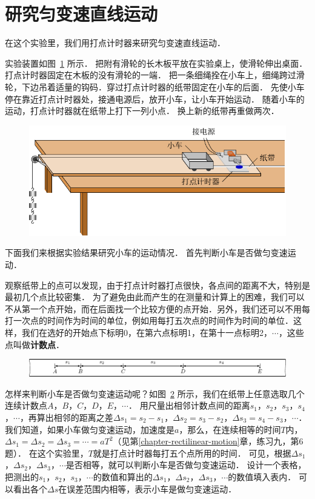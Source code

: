 \section{研究匀变速直线运动}\label{sec-A-app-1-7-study of-uniformly-variable-linear-motion}
在这个实验里，我们用打点计时器来研究匀变速直线运动．

实验装置如图~\ref{fig_A_10-9} 所示．
把附有滑轮的长木板平放在实验桌上，使滑轮伸出桌面．打点计时器固定在木板的没有滑轮的一端．
把一条细绳拴在小车上，细绳跨过滑轮，下边吊着适量的钩码．穿过打点计时器的纸带固定在小车的后面．
先使小车停在靠近打点计时器处，接通电源后，放开小车，让小车开始运动．
随着小车的运动，打点计时器就在纸带上打下一列小点．
换上新的纸带再重做两次．	
\begin{figure}[htbp]
    \centering
    \includegraphics{fig/A/10-9.pdf}
    \caption{}\label{fig_A_10-9}
\end{figure}

下面我们来根据实验结果研究小车的运动情况．
首先判断小车是否做匀变速运动．

观察纸带上的点可以发现，由于打点计时器打点很快，各点间的距离不大，特别是最初几个点比较密集．
为了避免由此而产生的在测量和计算上的困难，我们可以不从第一个点开始，而在后面找一个比较方便的点开始．另外，我们还可以不用每打一次点的时间作为时间的单位，例如用每打五次点的时间作为时间的单位．这样，我们在选好的开始点下标明0，在第六点标明1，在第十一点标明2，$\cdots$，这些点叫做\textbf{计数点}．

\begin{figure}[htbp]
    \centering
    \includegraphics{fig/A/10-10.pdf}
    \caption{}\label{fig_A_10-10}
\end{figure}
    

怎样来判断小车是否做匀变速运动呢？如图~\ref{fig_A_10-10} 所示，我们在纸带上任意选取几个连续计数点$A $，$ B $，$ C $，$ D $，$ E $，$ \cdots$．
用尺量出相邻计数点间的距离$s_1 $，$ s_2 $，$ s_3 $，$ s_4 $，$ \cdots$，再算出相邻的距离之差$\Delta s_1=s_2-s_1 $，$ \Delta s_2=s_3-s_2 $，$ \Delta s_3=s_4-s_3 $，$ \cdots$．
我们知道，如果小车做匀变速运动，加速度是$a$，那么，在连续相等的时间$T$内，$\Delta s_1=\Delta s_2=\Delta s_3=\cdots=aT^2$（见第\ref{chapter-rectilinear-motion}章，练习九，第6题）．
在这个实验里，$T$就是打点计时器每打五个点所用的时间．
可见，根据$\Delta s_1 $，$ \Delta s_2 $，$ \Delta s_3 $，$ \cdots$是否相等，就可以判断小车是否做匀变速运动．
设计一个表格，把测出的$s_1 $，$ s_2 $，$ s_3 $，$ \cdots$的数值和算出的$\Delta s_1 $，$ \Delta s_2 $，$ \Delta s_3 $，$ \cdots$的数值填入表内．
可以看出各个$\Delta s$在误差范围内相等，表示小车是做匀变速运动．

